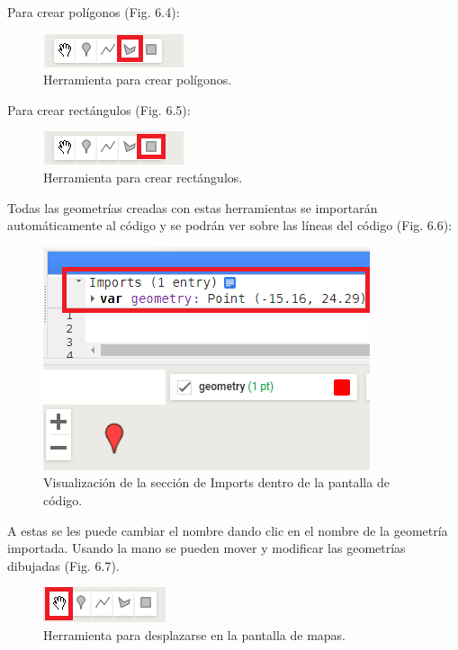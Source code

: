 \documentclass[
  12pt,
  letterpaper,
  twoside]{book}
\begin{document}
Para crear polígonos (Fig. 6.4):

\begin{figure}[btp]

{\centering \includegraphics[width=0.2\linewidth]{Img/poligono} 

}

\caption{Herramienta para crear polígonos.}\label{fig:unnamed-chunk-66}
\end{figure}

Para crear rectángulos (Fig. 6.5):

\begin{figure}[btp]

{\centering \includegraphics[width=0.2\linewidth]{Img/rec} 

}

\caption{Herramienta para crear rectángulos.}\label{fig:unnamed-chunk-67}
\end{figure}

Todas las geometrías creadas con estas herramientas se importarán automáticamente al código y se podrán ver sobre las líneas del código (Fig. 6.6):

\begin{figure}[btp]

{\centering \includegraphics[width=0.5\linewidth]{Img/import} 

}

\caption{Visualización de la sección de Imports dentro de la pantalla de código.}\label{fig:unnamed-chunk-68}
\end{figure}

A estas se les puede cambiar el nombre dando clic en el nombre de la geometría importada.
Usando la mano se pueden mover y modificar las geometrías dibujadas (Fig. 6.7).

\begin{figure}[btp]

{\centering \includegraphics[width=0.2\linewidth]{Img/mano} 

}

\caption{Herramienta para desplazarse en la pantalla de mapas.}\label{fig:unnamed-chunk-69}
\end{figure}
\end{document}
